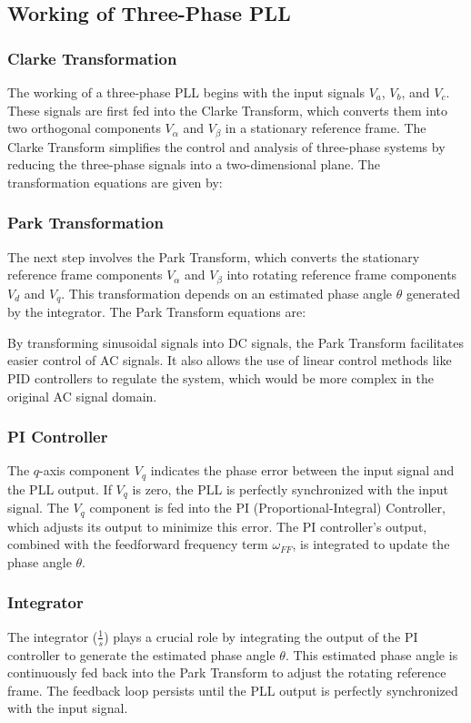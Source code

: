 \subsection{Working of Three-Phase PLL}

\subsubsection{Clarke Transformation}
The working of a three-phase PLL begins with the input signals \(V_a\),
\(V_b\), and \(V_c\). These signals are first fed into the Clarke Transform,
which converts them into two orthogonal components \(V_\alpha\) and \(V_\beta\)
in a stationary reference frame. The Clarke Transform simplifies the control
and analysis of three-phase systems by reducing the three-phase signals into a
two-dimensional plane. The transformation equations are given by:

\subsubsection{Park Transformation}
The next step involves the Park Transform, which converts the stationary
reference frame components \(V_\alpha\) and \(V_\beta\) into rotating reference
frame components \(V_d\) and \(V_q\). This transformation depends on an
estimated phase angle \(\theta\) generated by the integrator. The Park
Transform equations are:

By transforming sinusoidal signals into DC signals, the Park Transform
facilitates easier control of AC signals. It also allows the use of linear
control methods like PID controllers to regulate the system, which would be
more complex in the original AC signal domain.

\subsubsection{PI Controller}
The \(q\)-axis component \(V_q\) indicates the phase error between the input
signal and the PLL output. If \(V_q\) is zero, the PLL is perfectly
synchronized with the input signal. The \(V_q\) component is fed into the PI
(Proportional-Integral) Controller, which adjusts its output to minimize this
error. The PI controller's output, combined with the feedforward frequency term
\(\omega_{FF}\), is integrated to update the phase angle \(\theta\).

\subsubsection{Integrator}
The integrator (\(\frac{1}{s}\)) plays a crucial role by integrating the output
of the PI controller to generate the estimated phase angle \(\theta\). This
estimated phase angle is continuously fed back into the Park Transform to
adjust the rotating reference frame. The feedback loop persists until the PLL
output is perfectly synchronized with the input signal.

